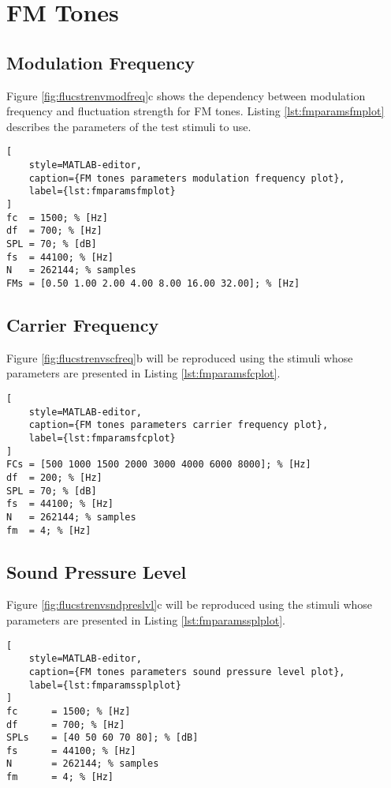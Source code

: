 \documentclass[a4paper]{article}
\begin{document}
\section{FM Tones}

\subsection{Modulation Frequency}

Figure \ref{fig:flucstrenvmodfreq}c shows the dependency between modulation
frequency and fluctuation strength for FM tones. Listing
\ref{lst:fmparamsfmplot} describes the parameters of the test stimuli to use.

\begin{lstlisting}[
    style=MATLAB-editor,
    caption={FM tones parameters modulation frequency plot},
    label={lst:fmparamsfmplot}
]
fc  = 1500; % [Hz]
df  = 700; % [Hz]
SPL = 70; % [dB]
fs  = 44100; % [Hz]
N   = 262144; % samples
FMs = [0.50 1.00 2.00 4.00 8.00 16.00 32.00]; % [Hz]
\end{lstlisting}

\subsection{Carrier Frequency}

Figure \ref{fig:flucstrenvscfreq}b will be reproduced using the stimuli whose
parameters are presented in Listing \ref{lst:fmparamsfcplot}.

\begin{lstlisting}[
    style=MATLAB-editor,
    caption={FM tones parameters carrier frequency plot},
    label={lst:fmparamsfcplot}
]
FCs = [500 1000 1500 2000 3000 4000 6000 8000]; % [Hz]
df  = 200; % [Hz]
SPL = 70; % [dB]
fs  = 44100; % [Hz]
N   = 262144; % samples
fm  = 4; % [Hz]
\end{lstlisting}

\subsection{Sound Pressure Level}

Figure \ref{fig:flucstrenvsndpreslvl}c will be reproduced using the stimuli
whose parameters are presented in Listing \ref{lst:fmparamssplplot}.

\begin{lstlisting}[
    style=MATLAB-editor,
    caption={FM tones parameters sound pressure level plot},
    label={lst:fmparamssplplot}
]
fc      = 1500; % [Hz]
df      = 700; % [Hz]
SPLs    = [40 50 60 70 80]; % [dB]
fs      = 44100; % [Hz]
N       = 262144; % samples
fm      = 4; % [Hz]
\end{lstlisting}
\end{document}
